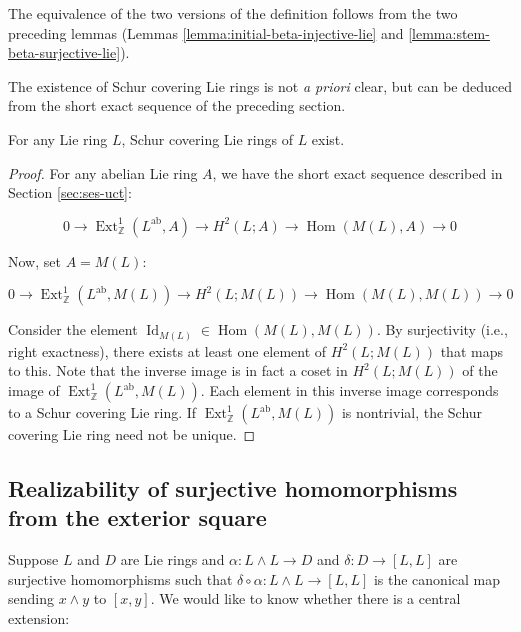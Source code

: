 The equivalence of the two versions of the definition follows from the
two preceding lemmas (Lemmas \ref{lemma:initial-beta-injective-lie} and
\ref{lemma:stem-beta-surjective-lie}).

The existence of Schur covering Lie rings is not {\em a priori} clear,
but can be deduced from the short exact sequence of the preceding
section. 

\begin{theorem}\label{thm:schur-covering-lie-rings-exist}
  For any Lie ring $L$, Schur covering Lie rings of $L$ exist.
\end{theorem}

\begin{proof}
  For any abelian Lie ring $A$, we have the short exact sequence
  described in Section \ref{sec:ses-uct}:

  \begin{equation*}
    0 \to \operatorname{Ext}^1_{\mathbb{Z}}(L^{\operatorname{ab}},A) \to H^2(L;A) \to \operatorname{Hom}(M(L),A) \to 0
  \end{equation*}
  
  Now, set $A = M(L)$:

  \begin{equation*}
    0 \to \operatorname{Ext}^1_{\mathbb{Z}}(L^{\operatorname{ab}},M(L)) \to H^2(L;M(L)) \to \operatorname{Hom}(M(L),M(L)) \to 0
  \end{equation*}
  
  Consider the element $\operatorname{Id}_{M(L)} \in
  \operatorname{Hom}(M(L),M(L))$. By surjectivity (i.e., right
  exactness), there exists at least one element of $H^2(L;M(L))$ that
  maps to this. Note that the inverse image is in fact a coset in
  $H^2(L;M(L))$ of the image of
  $\operatorname{Ext}^1_{\mathbb{Z}}(L^{\operatorname{ab}},M(L))$. Each
  element in this inverse image corresponds to a Schur covering
  Lie ring. If
  $\operatorname{Ext}^1_{\mathbb{Z}}(L^{\operatorname{ab}},M(L))$ is
  nontrivial, the Schur covering Lie ring need not be unique.
\end{proof}

\subsection{Realizability of surjective homomorphisms from the exterior square}

Suppose $L$ and $D$ are Lie rings and $\alpha:L \wedge L \to D$ and
$\delta:D \to [L,L]$ are surjective homomorphisms such that $\delta
\circ \alpha:L \wedge L \to [L,L]$ is the canonical map sending $x
\wedge y$ to $[x,y]$. We would like to know whether there is a central
extension:

